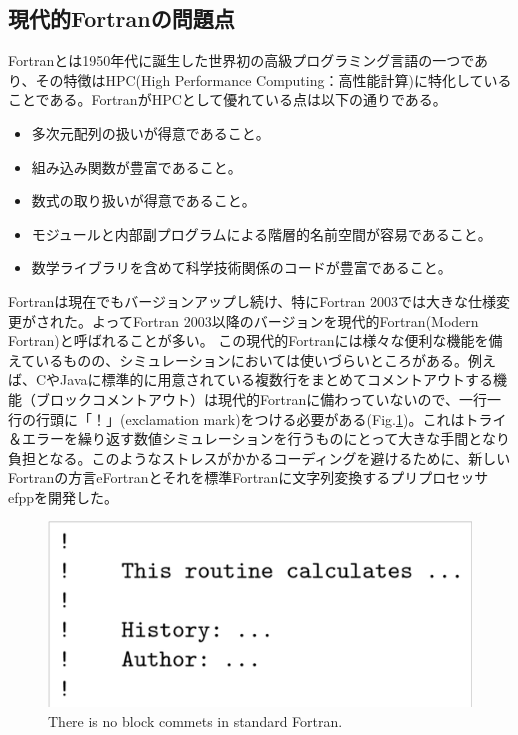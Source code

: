 \documentclass[12pt]{jsarticle}
\begin{document}
\subsection{現代的Fortranの問題点}
Fortranとは1950年代に誕生した世界初の高級プログラミング言語の一つであり、その特徴はHPC(High Performance Computing：高性能計算)に特化していることである。FortranがHPCとして優れている点は以下の通りである。


\begin{itemize}
\item 多次元配列の扱いが得意であること。
\item 組み込み関数が豊富であること。
\item 数式の取り扱いが得意であること。
\item モジュールと内部副プログラムによる階層的名前空間が容易であること。
\item 数学ライブラリを含めて科学技術関係のコードが豊富であること。
\end{itemize}

Fortranは現在でもバージョンアップし続け、特にFortran 2003では大きな仕様変更がされた。よってFortran 2003以降のバージョンを現代的Fortran(Modern Fortran)と呼ばれることが多い。
この現代的Fortranには様々な便利な機能を備えているものの、シミュレーションにおいては使いづらいところがある。例えば、CやJavaに標準的に用意されている複数行をまとめてコメントアウトする機能（ブロックコメントアウト）は現代的Fortranに備わっていないので、一行一行の行頭に「！」(exclamation mark)をつける必要がある(Fig.\ref{block-comment1})。これはトライ＆エラーを繰り返す数値シミュレーションを行うものにとって大きな手間となり負担となる。このようなストレスがかかるコーディングを避けるために、新しいFortranの方言eFortranとそれを標準Fortranに文字列変換するプリプロセッサefppを開発した。

\begin{figure}[H]
\centering
\includegraphics[height=0.5\textheight,width=1.0\hsize,angle=0,keepaspectratio]{./Image/block_comment1.png}
\caption{There is no block commets in standard Fortran.} \label{block-comment1}
\end{figure}
\end{document}
